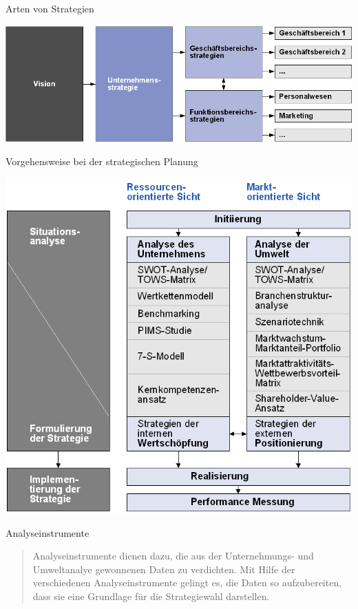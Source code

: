 \documentclass[12pt,ngerman,a4paper,ignorenonframetext,]{beamer}
\begin{document}
\begin{frame}{Arten von Strategien}
\protect\hypertarget{arten-von-strategien}{}

\begin{center}\includegraphics[width=0.8\linewidth]{./images/Marketingcontrolling/Strategiearten} \end{center}

\end{frame}

\begin{frame}[shrink]{Vorgehensweise bei der strategischen Planung}
\protect\hypertarget{vorgehensweise-bei-der-strategischen-planung}{}

\begin{center}\includegraphics[width=0.8\linewidth]{./images/Marketingcontrolling/Vorgehensweise2} \end{center}

\end{frame}

\begin{frame}{Analyseinstrumente}
\protect\hypertarget{analyseinstrumente}{}

\begin{quote}
Analyseinstrumente dienen dazu, die aus der Unternehmungs- und
Umweltanalye gewonnenen Daten zu verdichten. Mit Hilfe der verschiedenen
Analyseinstrumente gelingt es, die Daten so aufzubereiten, dass sie eine
Grundlage für die Strategiewahl darstellen.
\end{quote}

\end{frame}
\end{document}
